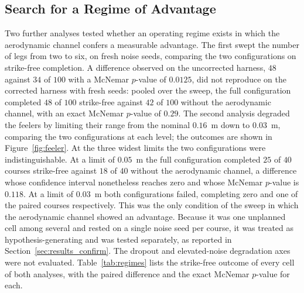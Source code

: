 \documentclass[final,5p,times]{elsarticle}
\begin{document}
\subsection{Search for a Regime of Advantage}
\label{sec:results_regimes}

Two further analyses tested whether an operating regime exists in which the aerodynamic channel confers a measurable advantage. The first swept the number of legs from two to six, on fresh noise seeds, comparing the two configurations on strike-free completion. A difference observed on the uncorrected harness, $48$ against $34$ of $100$ with a McNemar $p$-value of $0.0125$, did not reproduce on the corrected harness with fresh seeds: pooled over the sweep, the full configuration completed $48$ of $100$ strike-free against $42$ of $100$ without the aerodynamic channel, with an exact McNemar $p$-value of $0.29$. The second analysis degraded the feelers by limiting their range from the nominal $0.16$~m down to $0.03$~m, comparing the two configurations at each level; the outcomes are shown in Figure~\ref{fig:feeler}. At the three widest limits the two configurations were indistinguishable. At a limit of $0.05$~m the full configuration completed $25$ of $40$ courses strike-free against $18$ of $40$ without the aerodynamic channel, a difference whose confidence interval nonetheless reaches zero and whose McNemar $p$-value is $0.118$. At a limit of $0.03$~m both configurations failed, completing zero and one of the paired courses respectively. This was the only condition of the sweep in which the aerodynamic channel showed an advantage. Because it was one unplanned cell among several and rested on a single noise seed per course, it was treated as hypothesis-generating and was tested separately, as reported in Section~\ref{sec:results_confirm}. The dropout and elevated-noise degradation axes were not evaluated. Table~\ref{tab:regimes} lists the strike-free outcome of every cell of both analyses, with the paired difference and the exact McNemar $p$-value for each.
\end{document}
